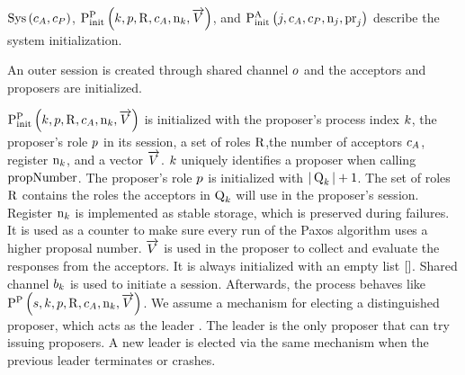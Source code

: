 $\operatorname{Sys}\left(c_A, c_P\right)$, $\textstyle\operatorname{P^{P}_{init}}\left(
    k,
    p,
    \operatorname{R},
    c_A,
    \operatorname{n}_{k},
    \overrightarrow{V}
\right)$, and $\textstyle\operatorname{P^{A}_{init}}\left(
    j,
    c_A,
    c_P,
    \operatorname{n}_{j},
    \operatorname{pr}_{j}
\right)$ describe the system initialization.

An outer session is created through shared channel $o$ and the acceptors and proposers are initialized.

$\textstyle\operatorname{P^{P}_{init}}\left(
    k,
    p,
    \operatorname{R},
    c_A,
    \operatorname{n}_{k},
    \overrightarrow{V}
\right)$ is initialized with the proposer's process index $k$, the proposer's role $p$ in its session, a set of roles $\operatorname{R}$,the number of acceptors $c_A$, register $\operatorname{n}_{k}$, and a vector $\overrightarrow{V}$.
$k$ uniquely identifies a proposer when calling $\operatorname{propNumber}$.
The proposer's role $p$ is initialized with $|\operatorname{Q}_{k}| + 1$.
The set of roles $\operatorname{R}$ contains the roles the acceptors in $\operatorname{Q}_{k}$ will use in the proposer's session.
Register $\operatorname{n}_{k}$ is implemented as stable storage, which is preserved during failures.
It is used as a counter to make sure every run of the Paxos algorithm uses a higher proposal number.
$\overrightarrow{V}$ is used in the proposer to collect and evaluate the responses from the acceptors.
It is always initialized with an empty list $\mathtt{[]}$.
Shared channel $b_{k}$ is used to initiate a session.
Afterwards, the process behaves like $\textstyle\operatorname{P^{P}_{}}\left(
    s,
    k,
    p,
    \operatorname{R},
    c_A,
    \operatorname{n}_{k},
    \overrightarrow{V}
\right)$.
We assume a mechanism for electing a distinguished proposer, which acts as the leader \cite{Lamport01}.
The leader is the only proposer that can try issuing proposers.
A new leader is elected via the same mechanism when the previous leader terminates or crashes.

